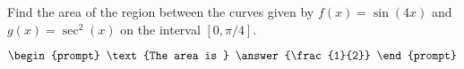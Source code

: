 \documentclass{ximera}
\author{Gregory Hartman \and Matthew Carr}
\begin{document}
\begin{exercise}






Find the area of the region between the curves given by $f(x)=\sin(4x)$ and $g(x)=\sec^{2}(x)$ on the interval $[0,\pi/4]$.

\[
\begin{prompt}
\text{The area is } \answer{\frac{1}{2}}
\end{prompt}
\]




\end{exercise}
\end{document}
